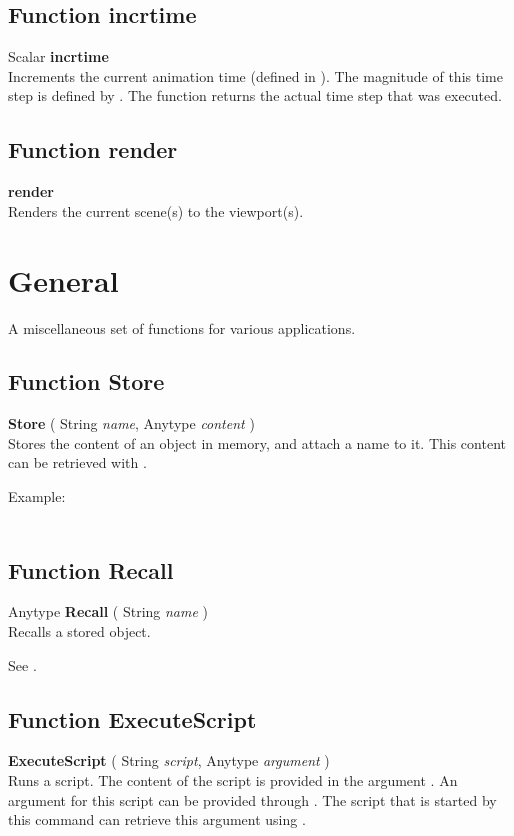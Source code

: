 \subsection{Function incrtime \label{F:incrtime}}
Scalar \textbf{incrtime} \\
Increments the current animation time (defined in ). The magnitude of this time step is defined by . The function returns the actual time step that was executed.

\subsection{Function render \label{F:render}}
\textbf{render} \\
Renders the current scene(s) to the viewport(s).

\section{General \label{General}}
A miscellaneous set of functions for various applications.

\subsection{Function Store \label{F:Store}}
\textbf{Store} ( String \textit{name}, Anytype \textit{content} ) \\
Stores the content of an object in memory, and attach a name to it. This content can be retrieved with .


Example: \\
 \\



\subsection{Function Recall \label{F:Recall}}
Anytype \textbf{Recall} ( String \textit{name} ) \\
Recalls a stored object.

See .

\subsection{Function ExecuteScript \label{F:ExecuteScript}}
\textbf{ExecuteScript} ( String \textit{script}, Anytype \textit{argument} ) \\
Runs a script. The content of the script is provided in the argument . An argument for this script can be provided through . The script that is started by this command can retrieve this argument using .

